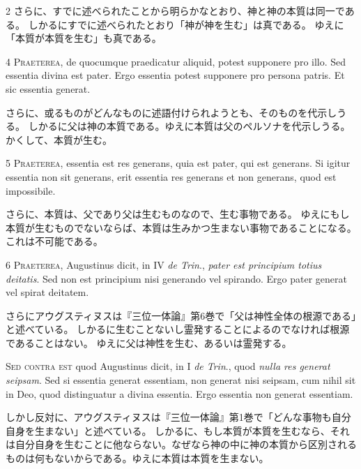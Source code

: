 \documentclass[paper=a4paper,fontsize=10pt,jafontsize=9pt,titlepage]{jlreq}
\begin{document}
\begin{paracol}{2}
さらに、すでに述べられたことから明らかなとおり、神と神の本質は同一である。
しかるにすでに述べられたとおり「神が神を生む」は真である。
ゆえに「本質が本質を生む」も真である。

\switchcolumn*

4 \textsc{Praeterea}, de quocumque praedicatur aliquid, potest supponere pro
illo. Sed essentia divina est pater. Ergo essentia potest supponere pro persona
patris. Et sic essentia generat.

\switchcolumn

さらに、或るものがどんなものに述語付けられようとも、そのものを代示しうる。
しかるに父は神の本質である。ゆえに本質は父のペルソナを代示しうる。
かくして、本質が生む。

\switchcolumn*

5 \textsc{Praeterea}, essentia est res generans, quia est pater, qui est
generans. Si igitur essentia non sit generans, erit essentia res generans et
non generans, quod est impossibile.

\switchcolumn

さらに、本質は、父であり父は生むものなので、生む事物である。
ゆえにもし本質が生むものでないならば、本質は生みかつ生まない事物であることになる。
これは不可能である。

\switchcolumn*

6 \textsc{Praeterea}, Augustinus dicit, in IV \textit{de Trin}., \textit{pater
est principium totius deitatis}. Sed non est principium nisi generando vel
spirando. Ergo pater generat vel spirat deitatem.

\switchcolumn

さらにアウグスティヌスは『三位一体論』第6巻で「父は神性全体の根源である」と述べている。
しかるに生むことないし霊発することによるのでなければ根源であることはない。
ゆえに父は神性を生む、あるいは霊発する。

\switchcolumn*

\textsc{Sed contra est} quod Augustinus dicit, in I \textit{de Trin}., quod
\textit{nulla res generat seipsam}. Sed si essentia generat essentiam, non
generat nisi seipsam, cum nihil sit in Deo, quod distinguatur a divina
essentia. Ergo essentia non generat essentiam.

\switchcolumn

しかし反対に、アウグスティヌスは『三位一体論』第1巻で「どんな事物も自分自身を生まない」と述べている。
しかるに、もし本質が本質を生むなら、それは自分自身を生むことに他ならない。なぜなら神の中に神の本質から区別されるものは何もないからである。ゆえに本質は本質を生まない。


\end{paracol}
\end{document}

